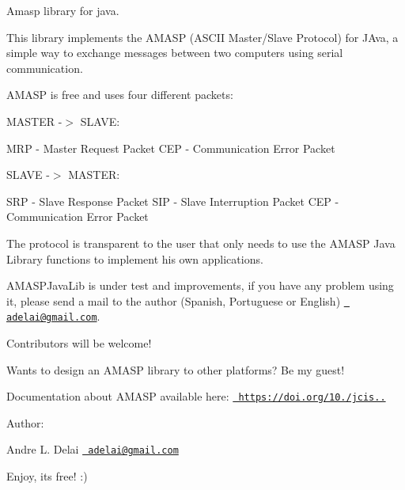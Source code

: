 Amasp library for java.

This library implements the A\+M\+A\+SP (A\+S\+C\+II Master/\+Slave Protocol) for J\+Ava, a simple way to exchange messages between two computers using serial communication.

A\+M\+A\+SP is free and uses four different packets\+:

M\+A\+S\+T\+ER -\/$>$ S\+L\+A\+VE\+:

M\+RP -\/ Master Request Packet C\+EP -\/ Communication Error Packet

S\+L\+A\+VE -\/$>$ M\+A\+S\+T\+ER\+:

S\+RP -\/ Slave Response Packet S\+IP -\/ Slave Interruption Packet C\+EP -\/ Communication Error Packet

The protocol is transparent to the user that only needs to use the A\+M\+A\+SP Java Library functions to implement his own applications.

A\+M\+A\+S\+P\+Java\+Lib is under test and improvements, if you have any problem using it, please send a mail to the author (Spanish, Portuguese or English) \href{mailto:adelai@gmail.com}{\texttt{ adelai@gmail.\+com}}.

Contributors will be welcome!

Wants to design an A\+M\+A\+SP library to other platforms? Be my guest!

Documentation about A\+M\+A\+SP available here\+: \href{https://doi.org/10.14209/jcis.2019.1}{\texttt{ https\+://doi.\+org/10./jcis..}}

Author\+:

Andre L. Delai \href{mailto:adelai@gmail.com}{\texttt{ adelai@gmail.\+com}}

Enjoy, it\textquotesingle{}s free! \+:) 